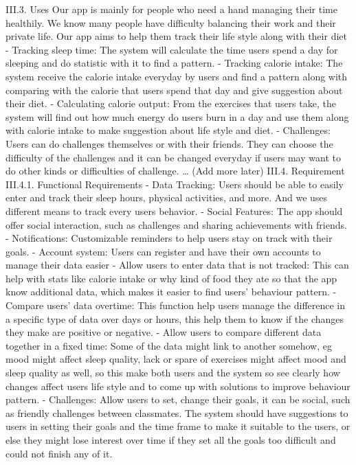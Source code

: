 \documentclass[12pt]{article}
\begin{document}
III.3. Uses
Our app is mainly for people who need a hand managing their time healthily. We know many people have difficulty balancing their work and their private life. Our app aims to help them track their life style along with their diet
-    Tracking sleep time: The system will calculate the time users spend a day for sleeping and do statistic with it to find a pattern.
-    Tracking calorie intake: The system receive the calorie intake everyday by users and find a pattern along with comparing with the calorie that users spend that day and give suggestion about their diet.
-    Calculating calorie output: From the exercises that users take, the system will find out how much energy do users burn in a day and use them along with calorie intake to make suggestion about life style and diet.
-    Challenges: Users can do challenges themselves or with their friends. They can choose the difficulty of the challenges and it can be changed everyday if users may want to do other kinds or difficulties of challenge.
…
(Add more later)
III.4. Requirement
III.4.1. Functional Requirements
-    Data Tracking: Users should be able to easily enter and track their sleep hours, physical activities, and more. And we uses different means to track every users behavior.
-    Social Features: The app should offer social interaction, such as challenges and sharing achievements with friends.
-    Notifications: Customizable reminders to help users stay on track with their goals.
-    Account system: Users can register and have their own accounts to manage their data easier
-    Allow users to enter data that is not tracked: This can help with stats like calorie intake or why kind of food they ate so that the app know additional data, which makes it easier to find users’ behaviour pattern.
-    Compare users’ data overtime: This function help users manage the difference in a specific type of data over days or hours, this help them to know if the changes they make are positive or negative.
-    Allow users to compare different data together in a fixed time: Some of the data might link to another somehow, eg mood might affect sleep quality, lack or spare of exercises might affect mood and sleep quality as well, so this make both users and the system so see clearly how changes affect users life style and to come up with solutions to improve behaviour pattern.
-    Challenges: Allow users to set, change their goals, it can be social, such as friendly challenges between classmates. The system should have suggestions to users in setting their goals and the time frame to make it suitable to the users, or else they might lose interest over time if they set all the goals too difficult and could not finish any of it.
 
\end{document}
